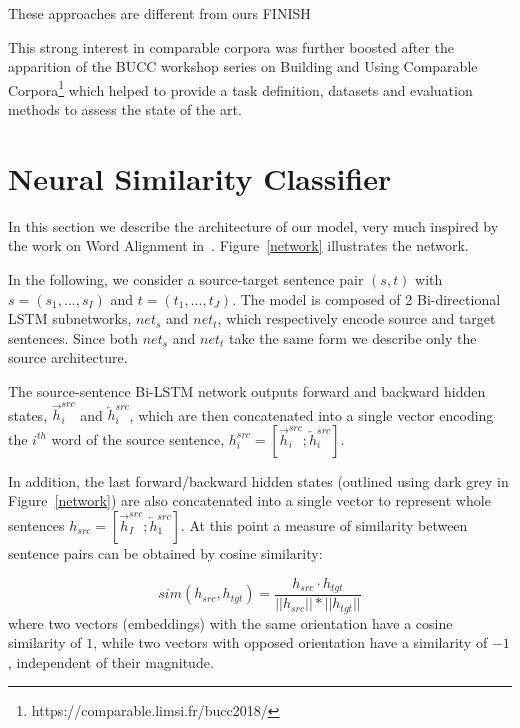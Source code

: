 \documentclass[11pt,a4paper]{article}
\begin{document}
These approaches are different from ours FINISH

This strong interest in comparable corpora was further boosted after the apparition of the BUCC workshop series on Building and Using Comparable Corpora\footnote{https://comparable.limsi.fr/bucc2018/} which helped to provide a task definition, datasets and evaluation methods to assess the state of the art. 

\section{Neural Similarity Classifier}
\label{sec:similarity}

In this section we describe the architecture of our model, very much inspired by the work on Word Alignment in~\cite{W16-2207}. Figure~\ref{network} illustrates the network.
 
In the following, we consider a source-target sentence pair $(s,t)$ with $s=(s_1,...,s_I)$ and $t=(t_1,...,t_J)$. The model is composed of 2 Bi-directional LSTM subnetworks, $net_s$ and $net_t$, which respectively encode source and target sentences. Since both $net_s$ and $net_t$ take the same form we describe only the source architecture.

The source-sentence Bi-LSTM network outputs forward and backward hidden states, $\overrightarrow{h}^{src}_i$ and $\overleftarrow{h}^{src}_i$, which are then concatenated into a single vector encoding the $i^{th}$ word of the source sentence, 
$h^{src}_i = [ \overrightarrow{h}^{src}_i ; \overleftarrow{h}^{src}_i ]$.

In addition, the last forward/backward hidden states (outlined using dark grey in Figure~\ref{network}) are also concatenated into a single vector  to represent whole sentences 
$h_{src} = [ \overrightarrow{h}^{src}_I ; \overleftarrow{h}^{src}_1 ]$.
At this point a measure of similarity between sentence pairs can be obtained by cosine similarity: 

\begin{equation}
    sim(h_{src}, h_{tgt}) = \frac{h_{src} \cdotp h_{tgt}}{||h_{src}|| * ||h_{tgt}||}
    \label{cosine}
\end{equation}
\noindent where two vectors (embeddings) with the same orientation have a cosine similarity of $1$, while two vectors with opposed orientation have a similarity of $-1$, independent of their magnitude.
\end{document}
